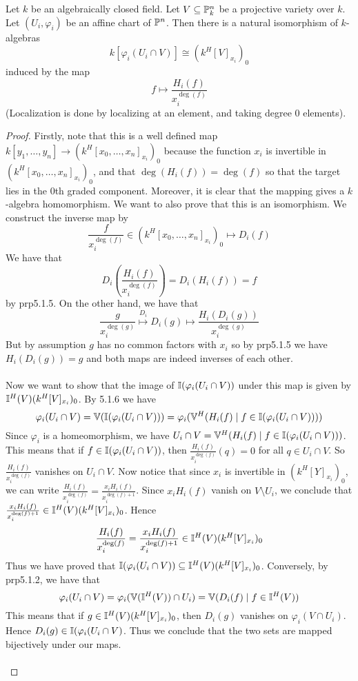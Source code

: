 \documentclass[a4paper]{article}
\begin{document}
\begin{prp}{}{} Let $k$ be an algebraically closed field. Let $V\subseteq\mathbb{P}_k^n$ be a projective variety over $k$. Let $(U_i,\varphi_i)$ be an affine chart of $\mathbb{P}^n$. Then there is a natural isomorphism of $k$-algebras $$k[\varphi_i(U_i\cap V)]\cong(k^H[V]_{x_i})_0$$ induced by the map $$f\mapsto\frac{H_i(f)}{x_i^{\deg(f)}}$$ (Localization is done by localizing at an element, and taking degree $0$ elements). \tcbline
\begin{proof}
Firstly, note that this is a well defined map $k[y_1,\dots,y_n]\to(k^H[x_0,\dots,x_n]_{x_i})_0$ because the function $x_i$ is invertible in $(k^H[x_0,\dots,x_n]_{x_i})_0$, and that $\deg(H_i(f))=\deg(f)$ so that the target lies in the $0$th graded component. Moreover, it is clear that the mapping gives a $k$-algebra homomorphism. We want to also prove that this is an isomorphism. We construct the inverse map by $$\frac{f}{x_i^{\deg(f)}}\in(k^H[x_0,\dots,x_n]_{x_i})_0\mapsto D_i(f)$$ We have that $$D_i\left(\frac{H_i(f)}{x_i^{\deg(f)}}\right)=D_i(H_i(f))=f$$ by prp5.1.5. On the other hand, we have that $$\frac{g}{x_i^{\deg(g)}}\overset{D_i}{\mapsto}D_i(g)\mapsto\frac{H_i(D_i(g))}{x_i^{\deg(g)}}$$ But by assumption $g$ has no common factors with $x_i$ so by prp5.1.5 we have $H_i(D_i(g))=g$ and both maps are indeed inverses of each other. \\~\\

Now we want to show that the image of $\mathbb{I}(\varphi_i(U_i\cap V))$ under this map is given by $\mathbb{I}^H(V)(k^H[V]_{x_i})_0$. By 5.1.6 we have $$\varphi_i(U_i\cap V)=\mathbb{V}(\mathbb{I}(\varphi_i(U_i\cap V)))=\varphi_i(\mathbb{V}^H(H_i(f)\;|\;f\in\mathbb{I}(\varphi_i(U_i\cap V))))$$ Since $\varphi_i$ is a homeomorphism, we have $U_i\cap V=\mathbb{V}^H(H_i(f)\;|\;f\in\mathbb{I}(\varphi_i(U_i\cap V)))$. This means that if $f\in\mathbb{I}(\varphi_i(U_i\cap V))$, then $\frac{H_i(f)}{x_i^{\deg(f)}}(q)=0$ for all $q\in U_i\cap V$. So $\frac{H_i(f)}{x_i^{\deg(f)}}$ vanishes on $U_i\cap V$. Now notice that since $x_i$ is invertible in $(k^H[Y]_{x_i})_0$, we can write $\frac{H_i(f)}{x_i^{\deg(f)}}=\frac{x_iH_i(f)}{x_i^{\deg(f)+1}}$. Since $x_iH_i(f)$ vanish on $V\setminus U_i$, we conclude that $\frac{x_iH_i(f)}{x_i^{\deg(f)+1}}\in\mathbb{I}^H(V)(k^H[V]_{x_i})_0$. Hence $$\frac{H_i(f)}{x_i^{\deg(f)}}=\frac{x_iH_i(f)}{x_i^{\deg(f)+1}}\in\mathbb{I}^H(V)(k^H[V]_{x_i})_0$$ Thus we have proved that $\mathbb{I}(\varphi_i(U_i\cap V))\subseteq\mathbb{I}^H(V)(k^H[V]_{x_i})_0$. Conversely, by prp5.1.2, we have that $$\varphi_i(U_i\cap V)=\varphi_i(\mathbb{V}(\mathbb{I}^H(V))\cap U_i)=\mathbb{V}(D_i(f)\;|\;f\in\mathbb{I}^H(V))$$ This means that if $g\in\mathbb{I}^H(V)(k^H[V]_{x_i})_0$, then $D_i(g)$ vanishes on $\varphi_i(V\cap U_i)$. Hence $D_i(g)\in\mathbb{I}(\varphi_i(U_i\cap V)$. Thus we conclude that the two sets are mapped bijectively under our maps. \\~\\


\end{proof}
\end{prp}
\end{document}
